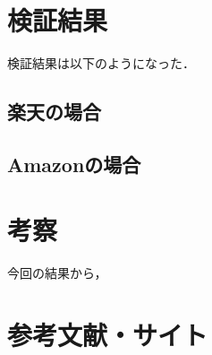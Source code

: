\documentclass[dvipdfmx]{jsarticle}
\begin{document}
        \section{検証結果}
            検証結果は以下のようになった．
            \subsection{楽天の場合}

            \subsection{Amazonの場合}

        \section{考察}
            今回の結果から，
        \section{参考文献・サイト}
\end{document}
